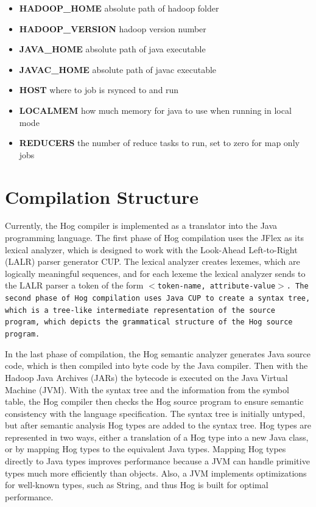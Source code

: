 \documentclass{article}
\begin{document}
\begin{itemize}

\item[] \textbf{HADOOP\_HOME} absolute path of hadoop folder
\item[] \textbf{HADOOP\_VERSION} hadoop version number
\item[] \textbf{JAVA\_HOME} absolute path of java executable
\item[] \textbf{JAVAC\_HOME} absolute path of javac executable
\item[] \textbf{HOST} where to job is rsynced to and run
\item[] \textbf{LOCALMEM} how much memory for java to use when running in local mode 
\item[] \textbf{REDUCERS} the number of reduce tasks to run, set to zero for map only jobs

\end{itemize}


\section{Compilation Structure} %
\label{sec:parsing_tools}

Currently, the Hog compiler is implemented as a translator into the Java
programming language. The first phase of Hog compilation uses the JFlex as its
lexical analyzer, which is designed to work with the Look-Ahead Left-to-Right
(LALR) parser generator CUP. The lexical analyzer creates lexemes, which are
logically meaningful sequences, and for each lexeme the lexical analyzer sends to
the LALR parser a token of the form \tt $<$token-name, attribute-value$>$\rm. The second
phase of Hog compilation uses Java CUP to create a syntax tree, which is a
tree-like intermediate representation of the source program, which depicts the
grammatical structure of the Hog source program.

In the last phase of compilation, the Hog semantic analyzer generates Java source
code, which is then compiled into byte code by the Java compiler. Then with the
Hadoop Java Archives (JARs) the bytecode is executed on the Java Virtual Machine
(JVM). With the syntax tree and the information from the symbol table, the Hog
compiler then checks the Hog source program to ensure semantic consistency with
the language specification. The syntax tree is initially untyped, but after
semantic analysis Hog types are added to the syntax tree. Hog types are
represented in two ways, either a translation of a Hog type into a new Java class,
or by mapping Hog types to the equivalent Java types. Mapping Hog types directly
to Java types improves performance because a JVM can handle primitive types much
more efficiently than objects. Also, a JVM implements optimizations for well-known
types, such as String, and thus Hog is built for optimal performance.
\end{document}
